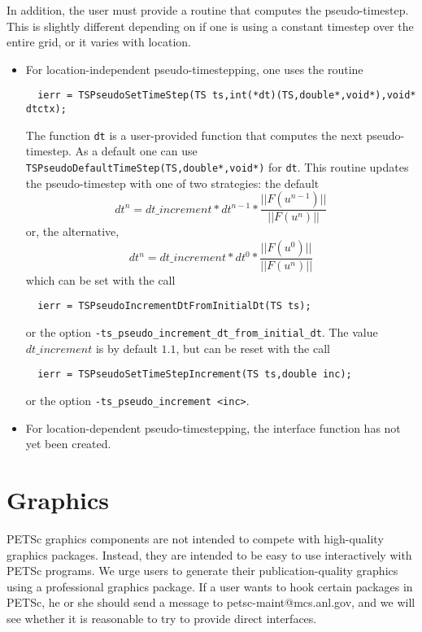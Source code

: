In addition, the user must provide a routine that computes the 
pseudo-timestep. This is slightly different depending on if 
one is using a constant timestep over the entire grid, or it varies
with location. 
\begin{itemize}
\item For location-independent pseudo-timestepping, one uses the routine 
\begin{verbatim}
  ierr = TSPseudoSetTimeStep(TS ts,int(*dt)(TS,double*,void*),void* dtctx);
\end{verbatim}
The function {\tt dt} is a user-provided function that computes the next 
pseudo-timestep. As a default one can use
{\tt TSPseudoDefaultTimeStep(TS,double*,void*)} for {\tt dt}. This routine
updates the pseudo-timestep with one of two strategies: the default
\[
   dt^{n} = dt\_increment*dt^{n-1}*\frac{|| F(u^{n-1}) ||}{|| F(u^{n})||}
\]
or, the alternative, 
\[
   dt^{n} = dt\_increment*dt^{0}*\frac{|| F(u^{0}) ||}{|| F(u^{n})||}
\]
which can be set with the call
\begin{verbatim}
  ierr = TSPseudoIncrementDtFromInitialDt(TS ts);
\end{verbatim}
or  
the option {\tt -ts\_pseudo\_increment\_dt\_from\_initial\_dt}. 
The value $ dt\_increment $ is by default $ 1.1$, but can be reset with the 
call 
\begin{verbatim}
  ierr = TSPseudoSetTimeStepIncrement(TS ts,double inc); 
\end{verbatim}
or  the option 
{\tt  -ts\_pseudo\_increment <inc>}. 


\item For location-dependent pseudo-timestepping, the interface function
      has not yet been created.
\end{itemize}


\chapter{Graphics}
\label{ch:graphics}

PETSc graphics components are not intended to compete with 
high-quality graphics packages.  Instead, they are intended to be 
easy to use interactively with PETSc programs. We urge users
to generate their publication-quality graphics using a
professional graphics package. If a user wants to hook
certain packages in PETSc, he or she should send a message to 
petsc-maint@mcs.anl.gov, and we will see whether it is reasonable
to try to provide direct interfaces.

